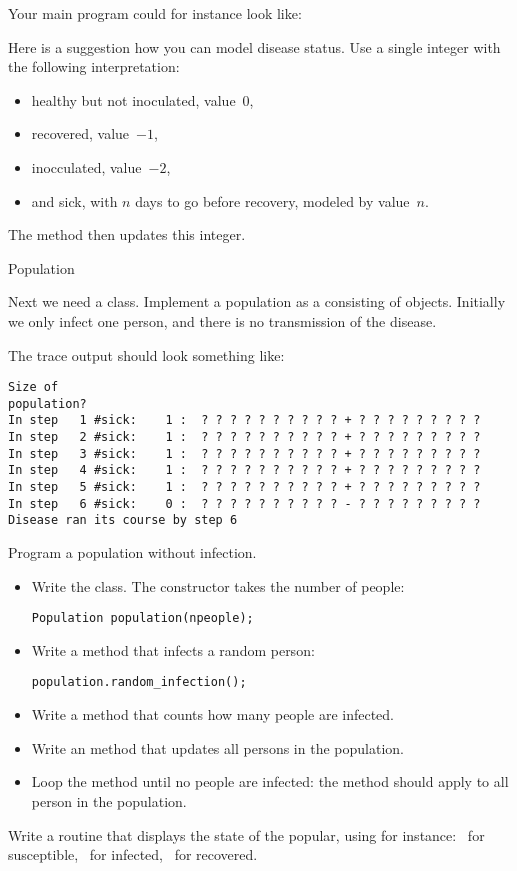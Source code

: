 
Your main program could for instance look like:

Here is a suggestion how you can model 
disease status. Use a single integer with the following interpretation:
\begin{itemize}
\item healthy but not inoculated, value~$0$,
\item recovered, value~$-1$,
\item inocculated, value~$-2$,
\item and sick, with $n$ days to go before recovery,  modeled by value~$n$.
\end{itemize}
The  method then updates this integer.

 {Population}

\prerequisite{\ref{ch:array}}

Next we need a  class. Implement a population as a 
consisting of  objects. Initially we only infect one person, and there
is no transmission of the disease.

The trace output should look something like:
\begin{verbatim}
Size of
population?
In step   1 #sick:    1 :  ? ? ? ? ? ? ? ? ? ? + ? ? ? ? ? ? ? ? ?
In step   2 #sick:    1 :  ? ? ? ? ? ? ? ? ? ? + ? ? ? ? ? ? ? ? ?
In step   3 #sick:    1 :  ? ? ? ? ? ? ? ? ? ? + ? ? ? ? ? ? ? ? ?
In step   4 #sick:    1 :  ? ? ? ? ? ? ? ? ? ? + ? ? ? ? ? ? ? ? ?
In step   5 #sick:    1 :  ? ? ? ? ? ? ? ? ? ? + ? ? ? ? ? ? ? ? ?
In step   6 #sick:    0 :  ? ? ? ? ? ? ? ? ? ? - ? ? ? ? ? ? ? ? ?
Disease ran its course by step 6
\end{verbatim}

\begin{exercise}
  \label{ex:infect:notransfer}
  Program a population without infection.
  \begin{itemize}
  \item Write the  class. The constructor takes the number of people:
\begin{verbatim}
Population population(npeople);  
\end{verbatim}
  \item Write a method that infects a random person:
\begin{verbatim}
population.random_infection();
\end{verbatim}
  \item Write a method  that counts how many people are infected.
  \item Write an  method that updates all persons in the population.
  \item Loop the  method until no people are infected: the
     method should apply  to
    all person in the population.
  \end{itemize}
\item Write a routine that displays the state of the popular, using
  for instance: ~for susceptible, \n{+}~for infected, \n{-}~for recovered.
\end{exercise}

